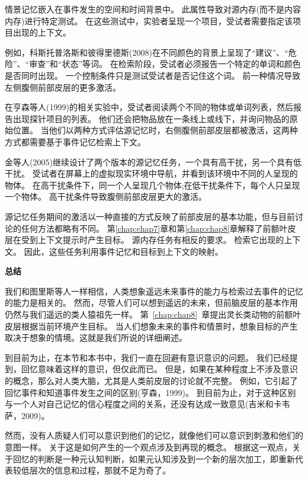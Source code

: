 情景记忆嵌入在事件发生的空间和时间背景中。
此属性导致对源内存(而不是内容内存)进行特定测试。
在这些测试中，实验者呈现一个项目，受试者需要指定该项目出现的上下文。


例如，科斯托普洛斯和彼得里德斯(2008)在不同颜色的背景上呈现了“建议”、“危险”、“审查”和“状态”等词。
在检索阶段，受试者必须报告一个特定的单词和颜色是否同时出现。
一个控制条件只是测试受试者是否记住这个词。
前一种情况导致左侧腹侧前部皮层的更多激活。


在亨森等人(1999)的相关实验中，受试者阅读两个不同的物体或单词列表，然后报告出现探针项目的列表。
他们还会把物品放在一条线上或线下，并询问物品的原始位置。
当他们以两种方式评估源记忆时，右侧腹侧前部皮层都被激活，这两种方式都需要基于事件记忆检索上下文。


金等人(2005)继续设计了两个版本的源记忆任务，一个具有高干扰，另一个具有低干扰。
受试者在屏幕上的虚拟现实环境中导航，并看到该环境中不同的人呈现的物体。
在高干扰条件下，同一个人呈现几个物体;在低干扰条件下，每个人只呈现一个物体。
高干扰条件导致腹侧前部皮层更大的激活。


源记忆任务期间的激活以一种直接的方式反映了前部皮层的基本功能，但与目前讨论的任何方法都略有不同。
第\ref{chap:chap7}章和第\ref{chap:chap8}章解释了前额叶皮层在受到上下文提示时产生目标。
源内存任务有相反的要求。
检索它出现的上下文。
因此，这些任务利用事件记忆和目标到上下文的映射。



\textbf{总结}

我们和图里斯等人一样相信，人类想象遥远未来事件的能力与检索过去事件的记忆的能力是相关的。
然而，尽管人们可以想到遥远的未来，但前脑皮层的基本作用仍然与我们遥远的类人猿祖先一样。
第~\ref{chap:chap8}~章提出灵长类动物的前额叶皮层根据当前环境产生目标。
当人们想象未来的事件和情景时，想象目标的产生取决于想象的情境。这就是我们所说的详细阐述。


到目前为止，在本节和本书中，我们一直在回避有意识意识的问题。
我们已经提到，回忆意味着这样的意识，但仅此而已。
但是，如果在某种程度上不涉及意识的概念，那么对人类大脑，尤其是人类前皮层的讨论就不完整。
例如，它引起了回忆事件和知道事件发生之间的区别(亨森，1999)。
到目前为止，对于这种区别与一个人对自己记忆的信心程度之间的关系，还没有达成一致意见(吉米和卡韦萨，2009)。


然而，没有人质疑人们可以意识到他们的记忆，就像他们可以意识到刺激和他们的意图一样。
关于这是如何产生的一个观点涉及到再现的概念。
根据这一观点，关于回忆的判断是一种元认知判断，如果元认知涉及到一个新的层次加工，即重新代表较低层次的信息和过程，那就不足为奇了。



